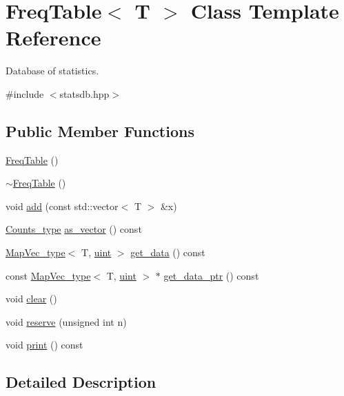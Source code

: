 \hypertarget{class_freq_table}{}\section{Freq\+Table$<$ T $>$ Class Template Reference}
\label{class_freq_table}


Database of statistics.  




{\ttfamily \#include $<$statsdb.\+hpp$>$}

\subsection*{Public Member Functions}
\begin{DoxyCompactItemize}
\item 
\hyperlink{class_freq_table_a2fdea53e35f9a301d7d1bbf6b7da5f41}{Freq\+Table} ()
\item 
\hyperlink{class_freq_table_a7ed627807a61c484243636137609abcd}{$\sim$\+Freq\+Table} ()
\item 
void \hyperlink{class_freq_table_a919e08556ba3aa9535a64827315bb89a}{add} (const std\+::vector$<$ T $>$ \&x)
\item 
\hyperlink{typedefs_8hpp_aee40fa17c1fddb63dd1f2b1470ade95b}{Counts\+\_\+type} \hyperlink{class_freq_table_a1898e62605d8753e170189936d403e05}{as\+\_\+vector} () const
\item 
\hyperlink{typedefs_8hpp_a02ed8dec96bc528c8bc3d8cb3c4674a5}{Map\+Vec\+\_\+type}$<$ T, \hyperlink{typedefs_8hpp_a91ad9478d81a7aaf2593e8d9c3d06a14}{uint} $>$ \hyperlink{class_freq_table_a7b99496d1c2f4193654752856b30d1a5}{get\+\_\+data} () const
\item 
const \hyperlink{typedefs_8hpp_a02ed8dec96bc528c8bc3d8cb3c4674a5}{Map\+Vec\+\_\+type}$<$ T, \hyperlink{typedefs_8hpp_a91ad9478d81a7aaf2593e8d9c3d06a14}{uint} $>$ $\ast$ \hyperlink{class_freq_table_ab5dd6677f52072c93d18b2b9a3369ae7}{get\+\_\+data\+\_\+ptr} () const
\item 
void \hyperlink{class_freq_table_a326660096e4309780aea8355d0f74ac7}{clear} ()
\item 
void \hyperlink{class_freq_table_a0bdced25f7c0bee38e073c4654578d19}{reserve} (unsigned int n)
\item 
void \hyperlink{class_freq_table_a4fe8f5e3b5bf64a1cbaf99deb96298d4}{print} () const
\end{DoxyCompactItemize}


\subsection{Detailed Description}
